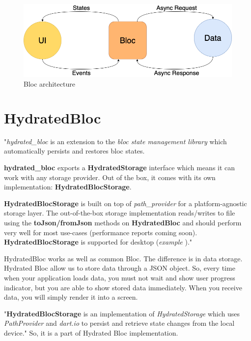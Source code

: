 \begin{figure}
    \centering
    \includegraphics[scale=0.4]{assets/bloc_architecture.png}
    \caption{Bloc architecture\cite{bloc}}
    \label{fig:bloc-architecture}
\end{figure}

\section{HydratedBloc}\label{subsec:hydratedbloc}
"\textit{hydrated\_bloc} \cite{hydratedBlocPubDev} is an extension to the \textit{bloc state management library} \cite{bloc} which automatically persists and restores bloc states.

\textbf{hydrated\_bloc} exports a \textbf{HydratedStorage} interface which means it can work with any storage provider.
Out of the box, it comes with its own implementation: \textbf{HydratedBlocStorage}.

\textbf{HydratedBlocStorage} is built on top of \textit{path\_provider} \cite{pathProvider} for a platform-agnostic storage layer.
The out-of-the-box storage implementation reads/writes to file using the \textbf{toJson/fromJson} methods on \textbf{HydratedBloc} and should perform very well for most use-cases (performance reports coming soon).
\textbf{HydratedBlocStorage} is supported for desktop (\textit{example} \cite{hydratedBlocExample})."\cite{hydratedBlocTut}

HydratedBloc works as well as common Bloc.
The difference is in data storage.
Hydrated Bloc allow us to store data through a JSON object.
So, every time when your application loads data, you must not wait and show user progress indicator, but you are able to show stored data immediately.
When you receive data, you will simply render it into a screen.

"\textbf{HydratedBlocStorage} is an implementation of \textit{HydratedStorage} which uses \textit{PathProvider} and \textit{dart.io} to persist and retrieve state changes from the local device."\cite{hydratedBlocStorage}
So, it is a part of Hydrated Bloc implementation.